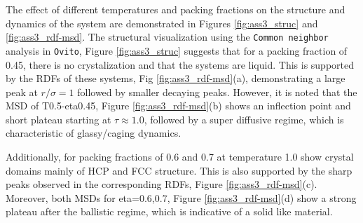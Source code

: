 \documentclass[10pt,a4paper]{labreport}
\begin{document}
The effect of different temperatures and packing fractions on the structure and dynamics of the system are demonstrated in Figures \ref{fig:ass3_struc} and \ref{fig:ass3_rdf-msd}. 
The structural visualization using the \texttt{Common neighbor} analysis in \texttt{Ovito}, Figure \ref{fig:ass3_struc} suggests that for a packing fraction of 0.45, there is no crystalization and that the systems are liquid. This is supported by the RDFs of these systems, Fig \ref{fig:ass3_rdf-msd}(a), demonstrating a large peak at $r/\sigma = 1$ followed by smaller decaying peaks. However, it is noted that the MSD of T0.5-eta0.45, Figure \ref{fig:ass3_rdf-msd}(b) shows an inflection point and short plateau starting at $\tau\approx 1.0$, followed by a super diffusive regime, which is characteristic of glassy/caging dynamics.  

Additionally, for packing fractions of 0.6 and 0.7 at temperature 1.0 show crystal domains mainly of HCP and FCC structure. This is also supported by the sharp peaks observed in the corresponding RDFs, Figure \ref{fig:ass3_rdf-msd}(c). Moreover, both MSDs for eta=0.6,0.7, Figure \ref{fig:ass3_rdf-msd}(d) show a strong plateau after the ballistic regime, which is indicative of a solid like material. 
\end{document}
